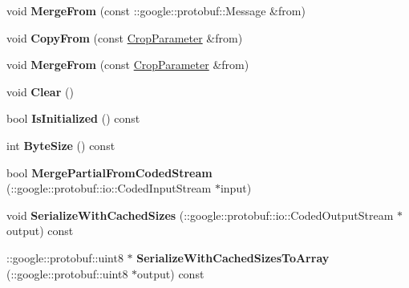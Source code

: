 \begin{DoxyCompactItemize}
void {\bfseries Merge\+From} (const \+::google\+::protobuf\+::\+Message \&from)
\item 
\mbox{\label{classcaffe_1_1_crop_parameter_a8040b684e6673dbd54db1c2e77e29707}} 
void {\bfseries Copy\+From} (const \mbox{\hyperlink{classcaffe_1_1_crop_parameter}{Crop\+Parameter}} \&from)
\item 
\mbox{\label{classcaffe_1_1_crop_parameter_a7088e95e135b3d0d20e9f0813e966b0e}} 
void {\bfseries Merge\+From} (const \mbox{\hyperlink{classcaffe_1_1_crop_parameter}{Crop\+Parameter}} \&from)
\item 
\mbox{\label{classcaffe_1_1_crop_parameter_a457d5c467682ca7a7873f842148a385c}} 
void {\bfseries Clear} ()
\item 
\mbox{\label{classcaffe_1_1_crop_parameter_a79102b6d82fe80791e7763422ae2838c}} 
bool {\bfseries Is\+Initialized} () const
\item 
\mbox{\label{classcaffe_1_1_crop_parameter_a116238ffb859415744fa78220c184d85}} 
int {\bfseries Byte\+Size} () const
\item 
\mbox{\label{classcaffe_1_1_crop_parameter_a22edf20a56034abc979257df498d38a0}} 
bool {\bfseries Merge\+Partial\+From\+Coded\+Stream} (\+::google\+::protobuf\+::io\+::\+Coded\+Input\+Stream $\ast$input)
\item 
\mbox{\label{classcaffe_1_1_crop_parameter_adefd7ef3b91e6004cdf2b496d2d5460b}} 
void {\bfseries Serialize\+With\+Cached\+Sizes} (\+::google\+::protobuf\+::io\+::\+Coded\+Output\+Stream $\ast$output) const
\item 
\mbox{\label{classcaffe_1_1_crop_parameter_adeb86292ac4af061480cfbf40783a816}} 
\+::google\+::protobuf\+::uint8 $\ast$ {\bfseries Serialize\+With\+Cached\+Sizes\+To\+Array} (\+::google\+::protobuf\+::uint8 $\ast$output) const
\item 
\mbox{\label{classcaffe_1_1_crop_parameter_a906161f986936f5024359ce0b66d7971}} 

\end{DoxyCompactItemize}
